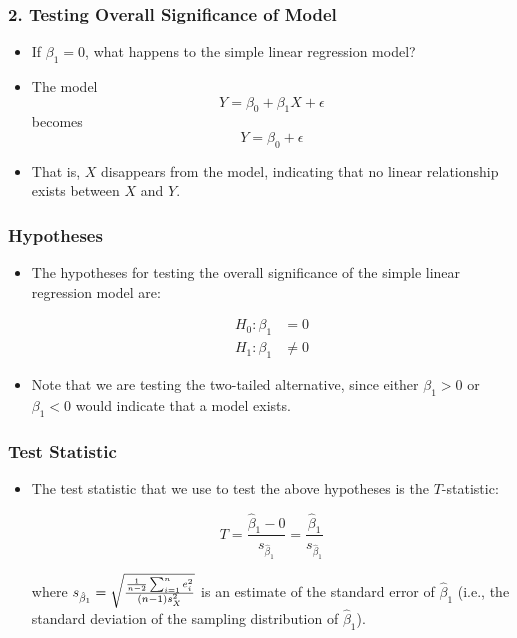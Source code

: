 \documentclass[12pt]{beamer}
\begin{document}
	\begin{frame}
		\frametitle{2. Testing Overall Significance of Model}
		
		\begin{itemize}[label={\color{blue}$\blacktriangleright$}]
			\item If $\beta_1 = 0$, what happens to the simple linear regression model?
			
			\item The model
			\[Y = \beta_0 + \beta_1X + \epsilon\]
			becomes
			\[Y = \beta_0 + \epsilon\]
			
			\item That is, $X$ disappears from the model, indicating that no linear relationship exists between $X$ and $Y$.
			
		\end{itemize}
		
	\end{frame}
	\begin{frame}
		\frametitle{Hypotheses}
		
		\begin{itemize}[label={\color{blue}$\blacktriangleright$}]
			\item The hypotheses for testing the overall significance of the simple linear regression model are:
			
			\[
			\begin{aligned}
				H_0 : \beta_1 &= 0 \\
				H_1 : \beta_1 &\neq 0
			\end{aligned}
			\]
			
			\item Note that we are testing the two-tailed alternative, since either $\beta_1 > 0$ or $\beta_1 < 0$ would indicate that a model exists.
			
		\end{itemize}
		
	\end{frame}
	\begin{frame}
		\frametitle{Test Statistic}
		
		\begin{itemize}[label={\color{blue}$\blacktriangleright$}]
			\item The test statistic that we use to test the above hypotheses is the $T$-statistic:
			
			\[
			T = \frac{\hat{\beta}_1 - 0}{s_{\hat{\beta}_1}} = \frac{\hat{\beta}_1}{s_{\hat{\beta}_1}}
			\]
			
			where $s_{\hat{\beta}_1} = \sqrt{\frac{1}{n-2}\sum_{i=1}^n e_i^2 \over (n-1)s_X^2}$ is an estimate of the standard error of $\hat{\beta}_1$ (i.e., the standard deviation of the sampling distribution of $\hat{\beta}_1$).
			
		\end{itemize}
		
	\end{frame}
\end{document}
